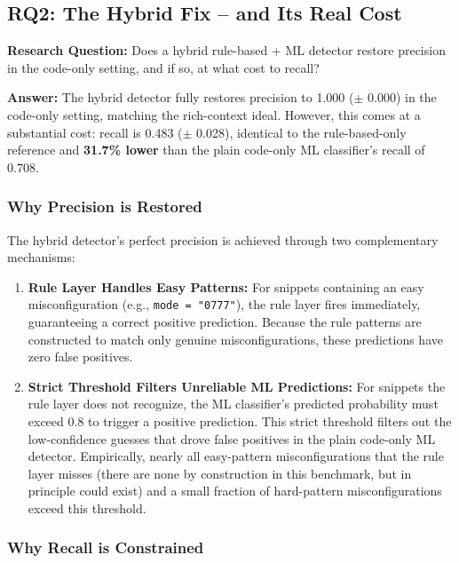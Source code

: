 \subsection{RQ2: The Hybrid Fix -- and Its Real Cost}
\label{sec:evalTwo}

\textbf{Research Question:} Does a hybrid rule-based + ML detector restore precision in the code-only setting, and if so, at what cost to recall?

\textbf{Answer:} The hybrid detector fully restores precision to 1.000 ($\pm$ 0.000) in the code-only setting, matching the rich-context ideal. However, this comes at a substantial cost: recall is 0.483 ($\pm$ 0.028), identical to the rule-based-only reference and \textbf{31.7\% lower} than the plain code-only ML classifier's recall of 0.708.

\subsubsection{Why Precision is Restored}

The hybrid detector's perfect precision is achieved through two complementary mechanisms:

\begin{enumerate}
  \item \textbf{Rule Layer Handles Easy Patterns:} For snippets containing an easy misconfiguration (e.g., \texttt{mode = "0777"}), the rule layer fires immediately, guaranteeing a correct positive prediction. Because the rule patterns are constructed to match only genuine misconfigurations, these predictions have zero false positives.
  
  \item \textbf{Strict Threshold Filters Unreliable ML Predictions:} For snippets the rule layer does not recognize, the ML classifier's predicted probability must exceed 0.8 to trigger a positive prediction. This strict threshold filters out the low-confidence guesses that drove false positives in the plain code-only ML detector. Empirically, nearly all easy-pattern misconfigurations that the rule layer misses (there are none by construction in this benchmark, but in principle could exist) and a small fraction of hard-pattern misconfigurations exceed this threshold.
\end{enumerate}

\subsubsection{Why Recall is Constrained}

